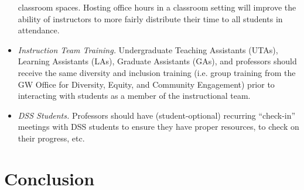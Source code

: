 \documentclass{article}
\begin{document}
\begin{itemize}
classroom spaces. Hosting office hours in a classroom setting will improve the ability of instructors to more 
fairly distribute their time to all students in attendance. 
\item
\emph{Instruction Team Training.} 
Undergraduate Teaching Assistants (UTAs), Learning Assistants (LAs), Graduate Assistants (GAs), and 
professors should receive the same diversity and inclusion training (i.e. group training from the GW Office 
for Diversity, Equity, and Community Engagement) prior to interacting with students as a member of the 
instructional team. 
\item
\emph{DSS Students.} 
Professors should have (student-optional) recurring “check-in” meetings with DSS students to 
ensure they have proper resources, to check on their progress, etc.
\end{itemize}

\section{Conclusion}\label{conclusion}
\end{document}

